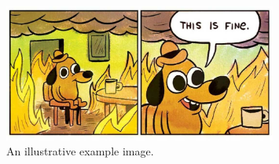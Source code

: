 \documentclass{article}
\begin{document}
\begin{figure}[ht]
\centering
\includegraphics[width=0.8\textwidth]{image.png}
\caption{An illustrative example image.}
\end{figure}
\end{document}
